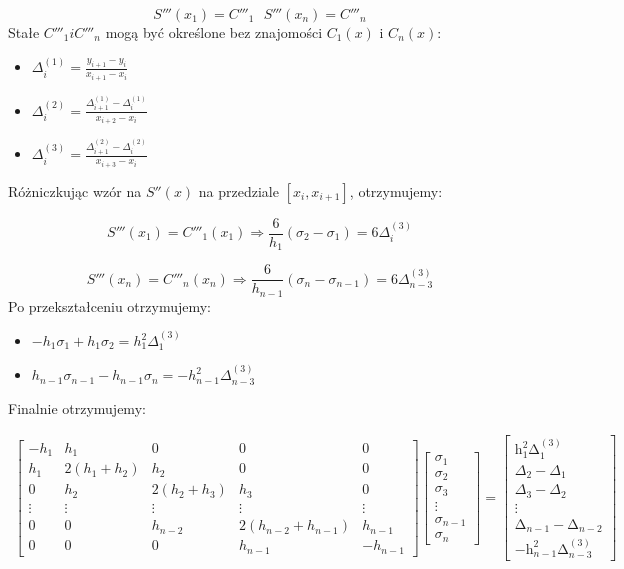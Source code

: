 \documentclass{article}
\begin{document}
\[S'''(x_1) = C'''_1 \ \ \ S'''(x_n) = C'''_n\]
\noindent
Stałe \(C'''_1 i C'''_n\) mogą być określone bez znajomości \(C_1(x)\) i \(C_n(x)\):

\begin{itemize}
\item \(\Delta_i^{(1)} = \frac{y_{i+1} - y_i}{x_{i+1}-x_i}\)
\item \(\Delta_i^{(2)} = \frac{\Delta_{i+1}^{(1)}-\Delta_i^{(1)}}{x_{i+2}-x_i}\)
\item \(\Delta_i^{(3)} = \frac{\Delta_{i+1}^{(2)}-\Delta_i^{(2)}}{x_{i+3}-x_i}\)
\end{itemize}
\noindent
Różniczkując wzór na \(S''(x)\) na przedziale \([x_i, x_{i+1}]\), otrzymujemy:

\[S'''(x_1) = C'''_1(x_1) \Rightarrow  \frac{6}{h_1}(\sigma_2-\sigma_1) = 6\Delta_i^{(3)}\]

\[S'''(x_n) = C'''_n(x_n) \Rightarrow  \frac{6}{h_{n-1}}(\sigma_n - \sigma_{n-1}) = 6\Delta_{n-3}^{(3)}\]
\noindent
Po przekształceniu otrzymujemy:

\begin{itemize}
\item \(-h_1\sigma_1 + h_1\sigma_2 = h_1^2\Delta_1^{(3)}\)
\item \(h_{n-1}\sigma_{n-1} - h_{n-1}\sigma_n = -h_{n-1}^2\Delta_{n-3}^{(3)}\)
\end{itemize}
\noindent
Finalnie otrzymujemy:

\begin{gather*}
\begin{bmatrix}
-h_1 & h_1 & 0 & 0 & 0 \\
h_1 & 2(h_1+h_2) & h_2 & 0 & 0 \\
0 & h_2 & 2(h_2+h_3) & h_3 & 0 \\
\vdots & \vdots & \vdots & \vdots & \vdots \\
0 & 0 & h_{n-2} & 2(h_{n-2} + h_{n-1}) & h_{n-1} \\
0 & 0 & 0 & h_{n-1} & -h_{n-1} 
\end{bmatrix}
\begin{bmatrix}
\sigma_1 \\
\sigma_2 \\
\sigma_3 \\
\vdots \\
\sigma_{n-1} \\
\sigma_n 
\end{bmatrix}
=
\begin{bmatrix}
\mathrm{h}_{1}^{2}\mathrm{\Delta}_{1}^{(3)} \\
\Delta_2 - \Delta_1 \\
\Delta_3 - \Delta_2 \\
\vdots \\
\mathrm{\Delta}_{n-1}^{} - \mathrm{\Delta}_{n-2}^{} \\
\mathrm{-h}_{n-1}^{2}\mathrm{\Delta}_{n-3}^{(3)} 
\end{bmatrix}
\end{gather*}
\end{document}
